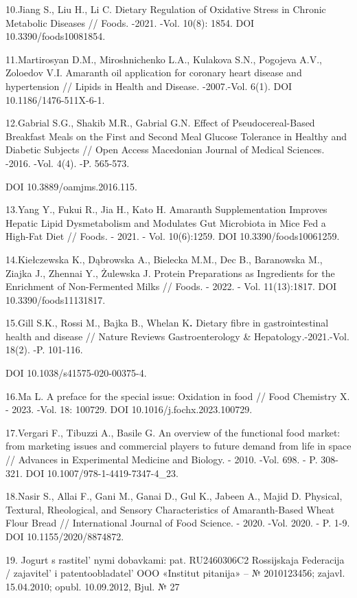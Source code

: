 {10.Jiang S., Liu H., Li C. Dietary Regulation of Oxidative Stress in
Chronic Metabolic Diseases // Foods. -2021. -Vol. 10(8): 1854. DOI
10.3390/foods10081854.

11.Martirosyan D.M., Miroshnichenko L.A., Kulakova S.N., Pogojeva A.V.,
Zoloedov V.I. Amaranth oil application for coronary heart disease and
hypertension // Lipids in Health and Disease\emph{.} -2007.-Vol. 6(1).
DOI 10.1186/1476-511X-6-1.

12.Gabrial S.G., Shakib M.R., Gabrial G.N. Effect of Pseudocereal-Based
Breakfast Meals on the First and Second Meal Glucose Tolerance in
Healthy and Diabetic Subjects // Open Access Macedonian Journal of
Medical Sciences. -2016. -Vol. 4(4). -P. 565-573.

DOI 10.3889/oamjms.2016.115.

13.Yang Y., Fukui R., Jia H., Kato H. Amaranth Supplementation Improves
Hepatic Lipid Dysmetabolism and Modulates Gut Microbiota in Mice Fed a
High-Fat Diet // Foods\emph{.} - 2021. - Vol. 10(6):1259. DOI
10.3390/foods10061259.

14.Kiełczewska K., Dąbrowska A., Bielecka M.M., Dec B., Baranowska M.,
Ziajka J., Zhennai Y., Żulewska J. Protein Preparations as Ingredients
for the Enrichment of Non-Fermented Milks // Foods. - 2022. - Vol.
11(13):1817. DOI 10.3390/foods11131817.

15.Gill S.K., Rossi M., Bajka B., Whelan K{\bfseries .} Dietary fibre in
gastrointestinal health and disease // Nature Reviews Gastroenterology
\& Hepatology\emph{.}-2021.-Vol. 18(2). -P. 101-116.

DOI 10.1038/s41575-020-00375-4.

16.Ma L. A preface for the special issue: Oxidation in food // Food
Chemistry X. - 2023. -Vol. 18: 100729. DOI 10.1016/j.fochx.2023.100729.

17.Vergari F., Tibuzzi A., Basile G. An overview of the functional food
market: from marketing issues and commercial players to future demand
from life in space // Advances in Experimental Medicine and Biology. -
2010. -Vol. 698. - P. 308-321. DOI 10.1007/978-1-4419-7347-4\_23.

18.Nasir S., Allai F., Gani M., Ganai D., Gul K., Jabeen A., Majid D.
Physical, Textural, Rheological, and Sensory Characteristics of
Amaranth-Based Wheat Flour Bread // International Journal of Food
Science. - 2020. -Vol. 2020. - P. 1-9. DOI 10.1155/2020/8874872.

19. Jogurt s rastitel' nymi dobavkami: pat. RU2460306C2
Rossijskaja Federacija / zajavitel'{} i
patentoobladatel'{} OOO «Institut pitanija» -- №
2010123456; zajavl. 15.04.2010; opubl. 10.09.2012, Bjul. № 27

}
